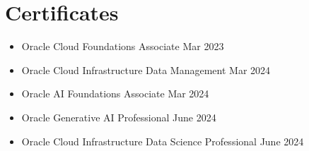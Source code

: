 \documentclass[letterpaper,11pt]{article}
\makeatletter
\newcommand{\resumeItem}[1]{
  \item\small{
    {#1 \vspace{-2pt}}
  }
}
\newcommand{\resumeOrganizationHeading}[4]{
  \vspace{-2pt}\item
    \begin{tabular*}{0.97\textwidth}[t]{l@{\extracolsep{\fill}}r}
      \textbf{#1} & \textit{\small #2} \\
      \textit{\small#3}
    \end{tabular*}\vspace{-7pt}
}
\newcommand{\resumeSubHeadingListStart}{\begin{itemize}[leftmargin=0.15in, label={}]}
\newcommand{\resumeSubHeadingListEnd}{\end{itemize}}
\newcommand{\resumeItemListStart}{\begin{itemize}}
\makeatother
\begin{document}

\section{Certificates}
  \resumeItemListStart
    
        \resumeItem
      {Oracle Cloud Foundations Associate}{Mar 2023}{}

        \resumeItem
      {Oracle Cloud Infrastructure Data Management}{Mar 2024}{}
    
        \resumeItem
      {Oracle AI Foundations Associate}{Mar 2024}{}
      
        \resumeItem
      {Oracle Generative AI Professional}{June 2024}{}

      \resumeItem
      {Oracle Cloud Infrastructure Data Science Professional}{June 2024}{}

      
    
  \resumeSubHeadingListEnd




    
    











\end{document}
